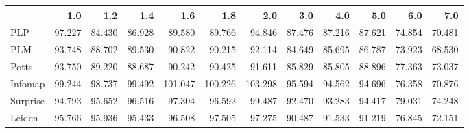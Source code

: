 \begin{tabular}{lrrrrrrrrrrr}
\toprule
{} &    1.0 &    1.2 &    1.4 &     1.6 &     1.8 &     2.0 &    3.0 &    4.0 &    5.0 &    6.0 &    7.0 \\
\midrule
PLP      & 97.227 & 84.430 & 86.928 &  89.580 &  89.766 &  94.846 & 87.476 & 87.216 & 87.621 & 74.854 & 70.481 \\
PLM      & 93.748 & 88.702 & 89.530 &  90.822 &  90.215 &  92.114 & 84.649 & 85.695 & 86.787 & 73.923 & 68.530 \\
Potts    & 93.750 & 89.220 & 88.687 &  90.242 &  90.425 &  91.611 & 85.829 & 85.805 & 88.896 & 77.363 & 73.037 \\
Infomap  & 99.244 & 98.737 & 99.492 & 101.047 & 100.226 & 103.298 & 95.594 & 94.562 & 94.696 & 76.358 & 70.876 \\
Surprise & 94.793 & 95.652 & 96.516 &  97.304 &  96.592 &  99.487 & 92.470 & 93.283 & 94.417 & 79.031 & 74.248 \\
Leiden   & 95.766 & 95.936 & 95.433 &  96.508 &  97.505 &  97.275 & 90.487 & 91.533 & 91.219 & 76.845 & 72.151 \\
\bottomrule
\end{tabular}
